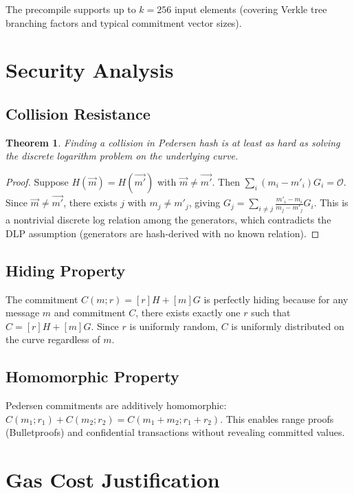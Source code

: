 \documentclass[11pt,a4paper]{article}
\newtheorem{theorem}{Theorem}
\begin{document}
The precompile supports up to $k = 256$ input elements (covering Verkle tree
branching factors and typical commitment vector sizes).

\section{Security Analysis}

\subsection{Collision Resistance}

\begin{theorem}
Finding a collision in Pedersen hash is at least as hard as solving the discrete
logarithm problem on the underlying curve.
\end{theorem}
\begin{proof}
Suppose $H(\vec{m}) = H(\vec{m'})$ with $\vec{m} \neq \vec{m'}$. Then
$\sum_i (m_i - m'_i) G_i = \mathcal{O}$. Since $\vec{m} \neq \vec{m'}$, there
exists $j$ with $m_j \neq m'_j$, giving
$G_j = \sum_{i \neq j} \frac{m'_i - m_i}{m_j - m'_j} G_i$.
This is a nontrivial discrete log relation among the generators, which contradicts
the DLP assumption (generators are hash-derived with no known relation).
\end{proof}

\subsection{Hiding Property}

The commitment $C(m; r) = [r]H + [m]G$ is perfectly hiding because for any
message $m$ and commitment $C$, there exists exactly one $r$ such that
$C = [r]H + [m]G$. Since $r$ is uniformly random, $C$ is uniformly distributed
on the curve regardless of $m$.

\subsection{Homomorphic Property}

Pedersen commitments are additively homomorphic:
$C(m_1; r_1) + C(m_2; r_2) = C(m_1 + m_2; r_1 + r_2)$.
This enables range proofs (Bulletproofs) and confidential transactions
without revealing committed values.

\section{Gas Cost Justification}
\end{document}
